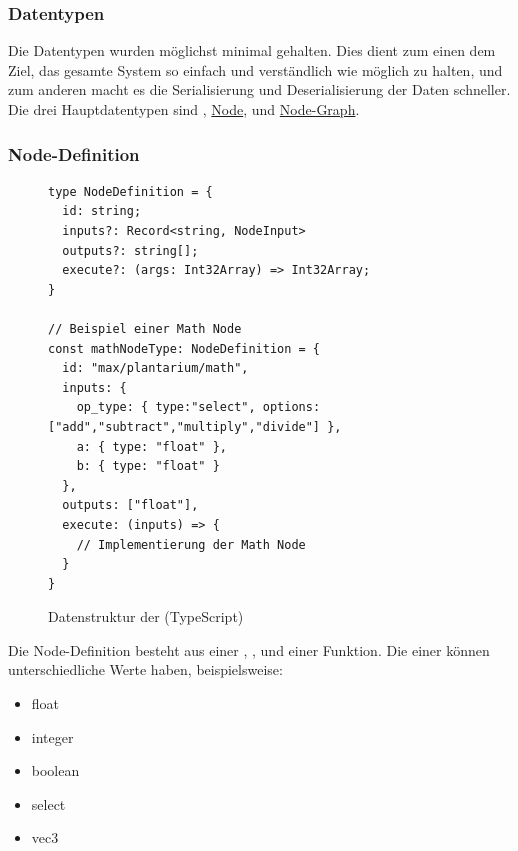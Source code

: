 \documentclass[ngerman]{article}
\begin{document}
\pagebreak

\subsubsection{Datentypen}

Die Datentypen wurden möglichst minimal gehalten. Dies dient zum einen dem Ziel, das gesamte System so einfach und verständlich wie möglich zu halten, und zum
anderen macht es die Serialisierung und Deserialisierung der Daten schneller.
\br
Die drei Hauptdatentypen sind  , \hyperref[fig:data_node]{Node},  und \hyperref[fig:data_node_graph]{Node-Graph}. 

\subsubsection*{Node-Definition}

\begin{figure}[htbp]
  \begin{code}
    \begin{verbatim}
type NodeDefinition = {
  id: string;
  inputs?: Record<string, NodeInput>
  outputs?: string[];
  execute?: (args: Int32Array) => Int32Array;
}

// Beispiel einer Math Node
const mathNodeType: NodeDefinition = {
  id: "max/plantarium/math",
  inputs: { 
    op_type: { type:"select", options: ["add","subtract","multiply","divide"] }, 
    a: { type: "float" }, 
    b: { type: "float" } 
  },
  outputs: ["float"],
  execute: (inputs) => {
    // Implementierung der Math Node
  }
}
    \end{verbatim}
  \end{code}

  \caption{Datenstruktur der  (TypeScript)}
  \label{sec:data_node_type}

\end{figure}

Die Node-Definition besteht aus einer , ,  und einer  Funktion. Die  einer  können unterschiedliche  Werte haben, beispielsweise:

\begin{itemize}
  \setlength\itemsep{0.0em}
  \item float
  \item integer
  \item boolean
  \item select
  \item vec3
\end{itemize}
\end{document}
